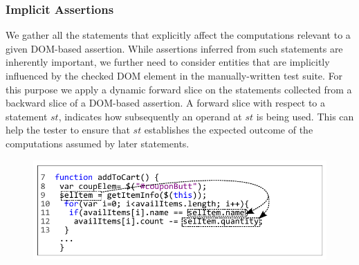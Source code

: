 \subsubsection{Implicit Assertions} \label{Sec:implicitAssertions}
We gather all the statements that explicitly affect the computations relevant to a given DOM-based assertion. While assertions inferred from such statements are inherently important, we further need to consider entities that are implicitly influenced by the checked DOM element in the manually-written test suite. For this purpose we apply a dynamic forward slice on the statements collected from a backward slice of a DOM-based assertion.
A forward slice with respect to a statement $st$,
indicates how subsequently an operand at $st$ is being used. This can help the tester to ensure that $st$ establishes the expected outcome of the computations assumed by later statements. 

\begin{figure}[!t]
  \centering
  \includegraphics[width=1\hsize]{fig/forwardSlicingExample}
   \vspace{-0.3in} 
  \label{Fig:forwardSlicingExample}
  \vspace{-0.2in} 
\end{figure}

